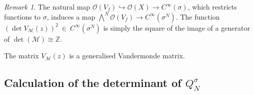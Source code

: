 \documentclass[a4paper,10pt]{amsart}
\theoremstyle{definition}
\theoremstyle{remark}
\newtheorem{rem}[thm]{Remark}
\numberwithin{equation}{section}
\newcommand{\To}{\longrightarrow}
\newcommand{\Z}{\mathbb Z}
\newcommand{\0}{\color{blue}{\mathsf{0}}}
\begin{document}
\begin{rem} \label{rem:VdMonlydependsonM} The natural map $\mathcal{O}(V_f)  \hookrightarrow \mathcal{O}(X) \rightarrow  C^{\infty} (\sigma)$,  which restricts functions to $\sigma$, induces a map  
$
\textstyle{\bigwedge^{\!\!N}} \mathcal{O}(V_f)   \To    C^{\infty} (\sigma^N) $. 
The function 
$ \left(\det V_{\mathcal{M}}(z)\right)^2 \   \in \      C^{\infty} (\sigma^N) $
is simply the square of the image of  a generator of 
$\det(\mathcal{M})\cong \Z$.
\end{rem}  

 
The matrix $V_{\mathcal{M}}(z)$ is a generalised Vandermonde matrix. 

\subsection{Calculation of the determinant of $Q^{\sigma}_N$}
\end{document}
